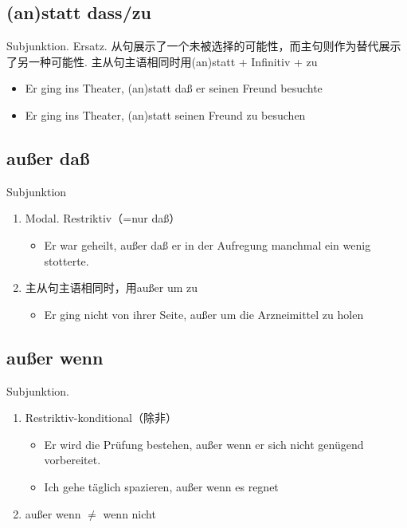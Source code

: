 \documentclass[UTF8]{report}
\begin{document}
\subsection{(an)statt dass/zu}
Subjunktion. Ersatz. 从句展示了一个未被选择的可能性，而主句则作为替代展示了另一种可能性. 主从句主语相同时用(an)statt + Infinitiv + zu
\begin{itemize}
    \item Er ging ins Theater, (an)statt daß er seinen Freund besuchte
    \item Er ging ins Theater, (an)statt seinen Freund zu besuchen
\end{itemize}

\subsection{außer daß}
Subjunktion
\begin{enumerate}
    \item Modal. Restriktiv（=nur daß）
    \begin{itemize}
        \item Er war geheilt, außer daß er in der Aufregung manchmal ein wenig stotterte.
    \end{itemize}
    \item 主从句主语相同时，用außer um zu
    \begin{itemize}
        \item Er ging nicht von ihrer Seite, außer um die Arzneimittel zu holen
    \end{itemize}
\end{enumerate}

\subsection{außer wenn}
Subjunktion.
\begin{enumerate}
    \item Restriktiv-konditional（除非）
    \begin{itemize}
        \item Er wird die Prüfung bestehen, außer wenn er sich nicht genügend vorbereitet.
        \item Ich gehe täglich spazieren, außer wenn es regnet
    \end{itemize}
    \item außer wenn $\ne$ wenn nicht
\end{enumerate}
\end{document}
